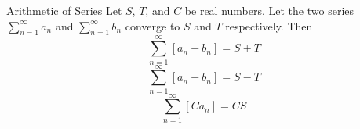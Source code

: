 \begin{frame}[t]
\begin{block}{Arithmetic of Series}
Let $S$, $T$, and $C$ be real numbers. Let the two series $\sum_{n=1}^\infty a_n$ and $\sum_{n=1}^\infty b_n$ converge to $S$ and $T$ respectively. Then
\[\sum_{n=1}^\infty [a_n+b_n]=S+T\]
\[\sum_{n=1}^\infty [a_n-b_n]=S-T\]
\[\sum_{n=1}^\infty [Ca_n]=CS\]

\end{block}
\end{frame}

